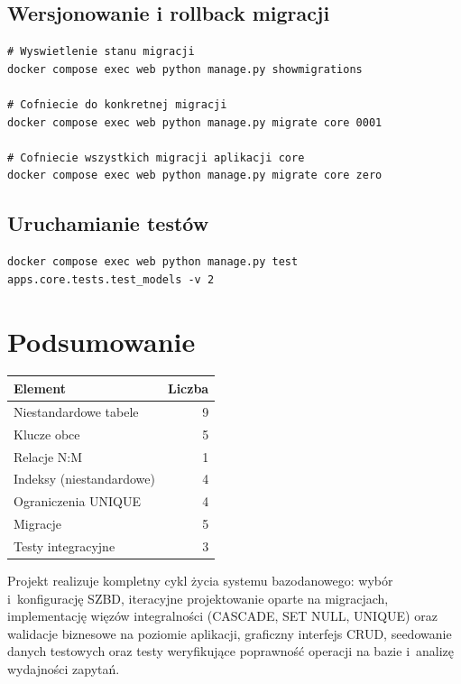 \documentclass[12pt,a4paper]{article}
\begin{document}
\subsection{Wersjonowanie i rollback migracji}

\begin{lstlisting}[style=consolestyle, caption={Zarządzanie migracjami}]
# Wyswietlenie stanu migracji
docker compose exec web python manage.py showmigrations

# Cofniecie do konkretnej migracji
docker compose exec web python manage.py migrate core 0001

# Cofniecie wszystkich migracji aplikacji core
docker compose exec web python manage.py migrate core zero
\end{lstlisting}

\subsection{Uruchamianie testów}

\begin{lstlisting}[style=consolestyle, caption={Uruchamianie testów integracyjnych}]
docker compose exec web python manage.py test apps.core.tests.test_models -v 2
\end{lstlisting}

\section{Podsumowanie}

\begin{center}
\begin{tabular}{lr}
\toprule
\textbf{Element} & \textbf{Liczba} \\
\midrule
Niestandardowe tabele & 9 \\
Klucze obce & 5 \\
Relacje N:M & 1 \\
Indeksy (niestandardowe) & 4 \\
Ograniczenia UNIQUE & 4 \\
Migracje & 5 \\
Testy integracyjne & 3 \\
\bottomrule
\end{tabular}
\end{center}

Projekt realizuje kompletny cykl życia systemu bazodanowego:
wybór i~konfigurację SZBD, iteracyjne projektowanie oparte na migracjach,
implementację więzów integralności (CASCADE, SET NULL, UNIQUE)
oraz walidacje biznesowe na poziomie aplikacji,
graficzny interfejs CRUD, seedowanie danych testowych oraz testy
weryfikujące poprawność operacji na bazie i~analizę wydajności zapytań.
\end{document}
